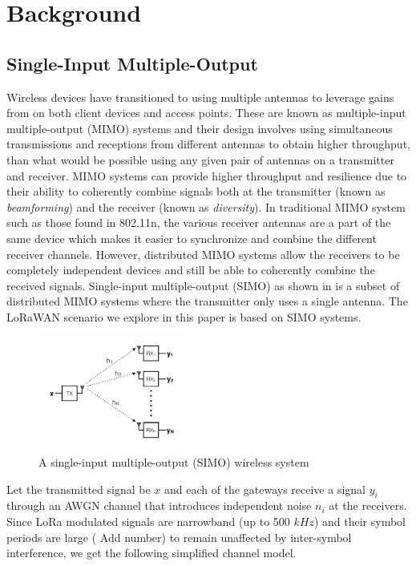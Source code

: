 \section{Background}
\label{sec:background}

\subsection{Single-Input Multiple-Output}
\label{sec:simo}

Wireless devices have transitioned to using multiple antennas to leverage gains from on both client devices and access points.
These are known as multiple-input multiple-output (MIMO) systems and their design involves using simultaneous transmissions and receptions from different antennas to obtain higher throughput, than what would be possible using any given pair of antennas on a transmitter and receiver.
MIMO systems can provide higher throughput and resilience due to their ability to coherently combine signals both at the transmitter (known as \textit{beamforming}) and the receiver (known as \textit{diversity}).
In traditional MIMO system such as those found in 802.11n, the various receiver antennas are a part of the same device which makes it easier to synchronize and combine the different receiver channels.
However, distributed MIMO systems allow the receivers to be completely independent devices and still be able to coherently combine the received signals.
Single-input multiple-output (SIMO) as shown in  is a subset of distributed MIMO systems where the transmitter only uses a single antenna.
The LoRaWAN scenario we explore in this paper is based on SIMO systems.

\begin{figure}[!htb]
    \centering
    \includegraphics[width=0.45\textwidth]{figures/SIMO}
    \caption{A single-input multiple-output (SIMO) wireless system}
    \label{fig:simo}
\end{figure}

Let the transmitted signal be $x$ and each of the gateways receive a signal $y_i$ through an AWGN channel that introduces independent noise $n_i$ at the receivers.
Since LoRa modulated signals are narrowband (up to 500 $kHz$) and their symbol periods are large ({\color{blue} Add number}) to remain unaffected by inter-symbol interference, we get the following simplified channel model.

